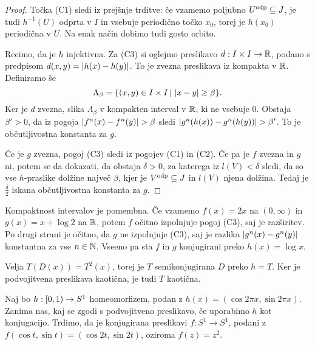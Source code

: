 \begin{proof}
  Točka (C1) sledi iz prejšnje trditve: če vzamemo poljubno $U ^\text{\normalfont odp}\subseteq J$, je tudi
  $h^{-1}(U)$ odprta v $I$ in vsebuje periodično točko $x_0$, torej je $h(x_0)$
  periodična v $U$.
  Na enak način dobimo tudi gosto orbito.

  Recimo, da je $h$ injektivna.
  Za (C3) si oglejmo preslikavo $d: I \times I \to \mathbb{R}$, podano s predpisom
  $d(x,y) = \left| h(x) - h(y) \right|$.
  To je zvezna preslikava iz kompakta v $\mathbb{R}$.
  Definiramo še
  \[
	\Lambda_\beta = \{ (x,y) \in I \times I \,|\, \left| x-y \right| \ge \beta \}.
  \]
  Ker je $d$ zvezna, slika $\Lambda_\beta$ v kompakten interval v $\mathbb{R}$, ki ne
  vsebuje $0$.
  Obstaja $\beta' > 0$, da iz pogoja $\left| f^n(x) - f^n(y) \right| > \beta$ sledi
  $\left| g^n(h(x)) - g^n(h(y)) \right| > \beta'$.
  To je občutljivostna konstanta za $g$.

  Če je $g$ zvezna, pogoj (C3) sledi iz pogojev (C1) in (C2).
  Če pa je $f$ zvezna in $g$ ni, potem se da dokazati, da obstaja $\delta > 0$,
  za katerega iz $l(V) < \delta$ sledi, da so vse $h$-praslike dolžine največ
  $\beta$, kjer je $V ^\text{\normalfont odp}\subseteq J$ in $l(V)$ njena dolžina.
  Tedaj je $\frac{\delta}{2}$ iskana občutljivostna konstanta za $g$.
\end{proof}

\begin{primer}
  Kompaktnost intervalov je pomembna.
  Če vzamemo $f(x) = 2x$ na $(0, \infty)$ in $g(x) = x + \log 2$ na $\mathbb{R}$, potem
  $f$ očitno izpolnjuje pogoj (C3), saj je razširitev.
  Po drugi strani je očitno, da $g$ ne izpolnjuje (C3), saj je razlika
  $\left| g^n(x) - g^n(y) \right|$ konstantna za vse $n \in \mathbb{N}$.
  Vseeno pa sta $f$ in $g$ konjugirani preko $h(x) = \log x$.
\end{primer}

\begin{primer}
  Velja $T(D(x)) = T^2(x)$, torej je $T$ semikonjugirana $D$ preko $h = T$.
  Ker je podvojitvena preslikava kaotična, je tudi $T$ kaotična.
\end{primer}

\begin{primer}
  Naj bo $h: \left[0, 1\right) \to S^1$ homeomorfizem, podan z $h(x) = (\cos 2 \pi x,
  \sin 2 \pi x)$.
  Zanima nas, kaj se zgodi s podvojitveno preslikavo, če uporabimo $h$ kot
  konjugacijo.
  Trdimo, da je konjugirana preslikavi $f: S^1 \to S^1$, podani z $f(\cos t,
  \sin t) = (\cos 2t, \sin 2t)$, oziroma $f(z) = z^2$.
\end{primer}

